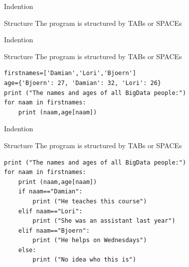 \documentclass{beamer}
\begin{document}
\begin{frame}[fragile]{Indention}
\begin{block}{Structure}
The program is structured by TABs or SPACEs
\end{block}

\end{frame}



{
\begin{frame}[plain]
\end{frame}
}

\begin{frame}[fragile]{Indention}
\begin{block}{Structure}
The program is structured by TABs or SPACEs
\end{block}
\begin{lstlisting}
firstnames=['Damian','Lori','Bjoern']
age={'Bjoern': 27, 'Damian': 32, 'Lori': 26}
print ("The names and ages of all BigData people:")
for naam in firstnames:
    print (naam,age[naam])
\end{lstlisting}
\end{frame}





\begin{frame}[fragile]{Indention}
\begin{block}{Structure}
The program is structured by TABs or SPACEs
\end{block}
\begin{lstlisting}
print ("The names and ages of all BigData people:")
for naam in firstnames:
    print (naam,age[naam])
    if naam=="Damian":
        print ("He teaches this course")
    elif naam=="Lori":
        print ("She was an assistant last year")
    elif naam=="Bjoern":
        print ("He helps on Wednesdays")
    else:
        print ("No idea who this is")
\end{lstlisting}
\end{frame}
\end{document}
